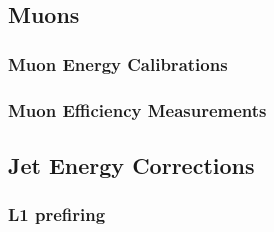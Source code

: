 \subsection{Muons}
\subsubsection{Muon Energy Calibrations}

\subsubsection{Muon Efficiency Measurements}
\label{sec:muonEffMeas}


\subsection{Jet Energy Corrections}


\subsubsection{L1 prefiring}

